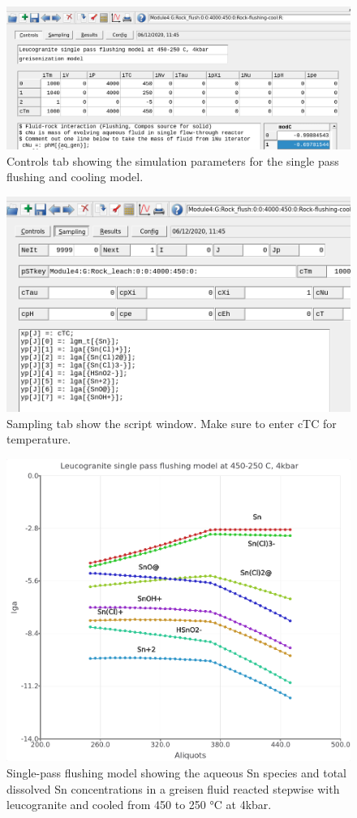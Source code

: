 \documentclass[
]{book}
\begin{document}
\begin{figure}
\includegraphics[width=0.9\linewidth]{figures/module4/fig-19} \caption{Controls tab showing the simulation parameters for the single pass flushing and cooling model.}\label{fig:fig-19d}
\end{figure}
\begin{figure}
\includegraphics[width=0.9\linewidth]{figures/module4/fig-20} \caption{Sampling tab show the script window. Make sure to enter cTC for temperature.}\label{fig:fig-20d}
\end{figure}
\begin{figure}
\includegraphics[width=0.9\linewidth]{figures/module4/fig-21} \caption{Single-pass flushing model showing the aqueous Sn species and total dissolved Sn concentrations in a greisen fluid reacted stepwise with leucogranite and cooled from  450 to 250 °C at 4kbar.}\label{fig:fig-21d}
\end{figure}
\end{document}
